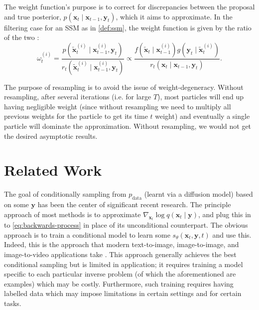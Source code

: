\begin{remark}
    The weight function's purpose is to correct for discrepancies between the proposal and true
    posterior, $p(\mathbf{x}_t \mid \mathbf{x}_{t-1}, \mathbf{y}_t)$, which it aims to approximate. In the
    filtering case for an SSM as in \autoref{def:ssm}, the weight function is given by the ratio of the
    two \parencite{chopinIntroductionSequentialMonte2020}:
    \begin{equation}
        \omega_t^{(i)} = \frac{p(\tilde{\mathbf{x}}_t^{(i)} \mid \mathbf{x}_{t-1}^{(i)}, \mathbf{y}_t)}{r_t(\tilde{\mathbf{x}}_t^{(i)} \mid \mathbf{x}_{t-1}^{(i)}, \mathbf{y}_{t})}
        \propto \frac{f(\tilde{\mathbf{x}}_t \mid \mathbf{x}_{t-1}^{(i)})g(\mathbf{y}_t \mid \tilde{\mathbf{x}}_t^{(i)})}{r_t(\mathbf{x}_t \mid \mathbf{x}_{t-1}, \mathbf{y}_{t})}. \label{eq:weight-func-gen}
    \end{equation}
\end{remark}

\begin{remark}[Resampling]
    The purpose of resampling is to avoid the issue of weight-degeneracy. Without resampling,
    after several iterations (i.e. for large $T$), most particles will end up having negligible
    weight (since without resampling we need to multiply all previous weights for the particle to
    get its time $t$ weight) and eventually a single particle will dominate the approximation.
    Without resampling, we would not get the desired asymptotic results.
\end{remark}

\section{Related Work} \label{sec:related-work}

The goal of conditionally sampling from $p_{\text{data}}$ (learnt via a diffusion model) based on
some $\mathbf{y}$ has been the center of significant recent research. The principle approach of most
methods is to approximate $\nabla_{\mathbf{x}_t}\log q(\mathbf{x}_t \mid \mathbf{y})$, and plug this
in to \autoref{eq:backwards-process} in place of its unconditional counterpart. The obvious approach is
to train a conditional model to learn some $s_{\theta}(\mathbf{x}_t, \mathbf{y}, t)$ and use this.
Indeed, this is the approach that modern text-to-image, image-to-image, and image-to-video
applications take \parencite{nicholGLIDEPhotorealisticImage2021,liDiffusionModelsImage2023,
sahariaPaletteImagetoImageDiffusion2021,sahariaPaletteImagetoImageDiffusion2021,
rombachHighResolutionImageSynthesis2021}. This approach generally achieves the best conditional
sampling but is limited in application; it requires training a model specific to each particular
inverse problem (of which the aforementioned are examples) which may be costly. Furthermore, such
training requires having labelled data which may impose limitations in certain settings and for
certain tasks.

